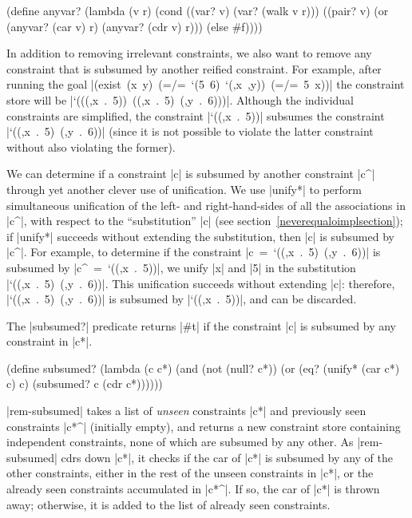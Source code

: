 \schemedisplayspace
\begin{schemedisplay}
(define anyvar?
  (lambda (v r)
    (cond
      ((var? v) (var? (walk v r)))
      ((pair? v) (or (anyvar? (car v) r) (anyvar? (cdr v) r)))
      (else #f))))
\end{schemedisplay}

In addition to removing irrelevant constraints, we also want to remove
any constraint that is subsumed by another reified constraint.  For example,
after running the goal \mbox{\scheme|(exist (x y) (=/= `(5 6) `(,x ,y)) (=/= 5 x))|}
the constraint store will be \mbox{\scheme|`(((,x . 5)) ((,x . 5) (,y . 6)))|}.
Although the individual constraints are simplified, the constraint \mbox{\scheme|`((,x . 5))|}
subsumes the constraint \mbox{\scheme|`((,x . 5) (,y . 6))|}
(since it is not possible to violate the latter constraint without
also violating the former).

We can determine if a constraint \scheme|c| is subsumed by another
constraint \scheme|c^| through yet another clever use of unification.
We use \scheme|unify*| to perform simultaneous unification of the left-
and right-hand-sides of all the associations in \scheme|c^|, with
respect to the ``substitution'' \scheme|c| (see section~\ref{neverequaloimplsection}); 
if \scheme|unify*|
succeeds without extending the substitution, then \scheme|c| is
subsumed by \scheme|c^|.  For example, to determine if the constraint
\mbox{\scheme|c = `((,x . 5) (,y . 6))|} is subsumed by
\mbox{\scheme|c^ = `((,x . 5))|}, we unify \scheme|x| and \scheme|5|
in the substitution \mbox{\scheme|`((,x . 5) (,y . 6))|}.  This
unification succeeds without extending \scheme|c|: therefore,
\mbox{\scheme|`((,x . 5) (,y . 6))|} is subsumed by
\mbox{\scheme|`((,x . 5))|}, and can be discarded.

The \scheme|subsumed?| predicate returns \scheme|#t| if the constraint
\scheme|c| is subsumed by any constraint in \scheme|c*|.

\schemedisplayspace
\begin{schemedisplay}
(define subsumed?
  (lambda (c c*)
    (and (not (null? c*))
         (or (eq? (unify* (car c*) c) c)
             (subsumed? c (cdr c*))))))
\end{schemedisplay}

\scheme|rem-subsumed| takes a list of \emph{unseen} constraints
\scheme|c*| and previously seen constraints \scheme|c*^| (initially
empty), and returns a new constraint store containing independent
constraints, none of which are subsumed by any other.  As
\scheme|rem-subsumed| cdrs down \scheme|c*|, it checks if the car of \scheme|c*| is
subsumed by any of the other constraints, either in the rest of the
unseen constraints in \scheme|c*|, or the already seen constraints accumulated
in \scheme|c*^|.  If so, the car of \scheme|c*| is thrown away;
otherwise, it is added to the list of already seen constraints.

